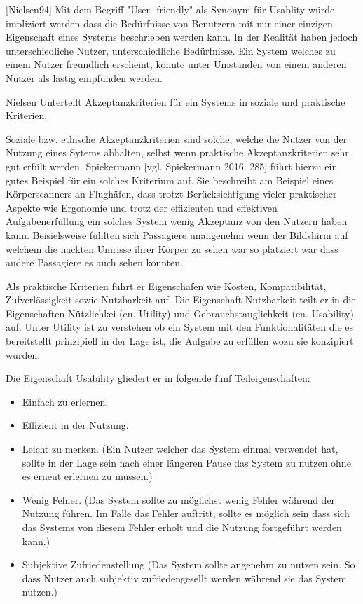[Nielsen94] Mit dem Begriff "User- friendly" als Synonym für Usablity würde impliziert werden dass die Bedürfnisse von Benutzern mit nur einer einzigen Eigenschaft eines Systems beschrieben werden kann. 
In der Realität haben jedoch unterschiedliche Nutzer, unterschiedliche Bedürfnisse. Ein System welches zu einem Nutzer freundlich erscheint, könnte unter Umständen von einem anderen Nutzer als lästig empfunden werden.

Nielsen Unterteilt Akzeptanzkriterien für ein Systems in soziale und praktische Kriterien.

Soziale bzw. ethische Akzeptanzkriterien sind solche, welche  die Nutzer von der Nutzung eines Sytems abhalten, selbst wenn praktische Akzeptanzkriterien sehr gut erfült werden. 
Spiekermann [vgl. Spiekermann 2016: 285] führt hierzu ein gutes Beispiel für ein solches Kriterium auf. Sie beschreibt am Beispiel eines Körperscanners an Flughäfen, dass trotzt  Berücksichtigung vieler 
praktischer Aspekte wie Ergonomie und trotz der effizienten und effektiven Aufgabenerfüllung ein solches System wenig Akzeptanz von den Nutzern haben kann. Beisielsweise fühlten sich Passagiere 
unangenehm wenn der Bildshirm auf welchem die nackten Umrisse ihrer Körper zu sehen war so platziert war dass andere Passagiere es auch sehen konnten.  

Als praktische Kriterien führt er Eigenschafen wie Kosten, Kompatibilität, Zufverlässigkeit sowie Nutzbarkeit auf. 
Die Eigenschaft Nutzbarkeit teilt er in die Eigenschaften Nützlichkei (en. Utility) und Gebrauchstauglichkeit (en. Usability) auf. Unter Utility ist zu verstehen ob ein System mit den Funktionalitäten die es bereitstellt prinzipiell 
in der Lage ist, die Aufgabe zu erfüllen wozu sie konzipiert wurden.

Die Eigenschaft Usability gliedert er in folgende fünf Teileigenschaften: 

\begin{itemize}
	\item Einfach zu erlernen.
	\item Effizient in der Nutzung.
	\item Leicht zu merken. (Ein Nutzer welcher das System einmal verwendet hat, sollte in der Lage sein nach einer längeren Pause das System zu nutzen ohne es erneut erlernen zu müssen.)
	\item Wenig Fehler. (Das System sollte zu möglichst wenig Fehler während der Nutzung führen. Im Falle das Fehler auftritt, sollte es möglich sein dass sich das Systems von diesem Fehler erholt und die Nutzung fortgeführt werden kann.)
	\item Subjektive Zufriedenstellung (Das System sollte angenehm zu nutzen sein. So dass Nutzer auch subjektiv zufriedengesellt werden während sie das System nutzen.)
\end{itemize}

